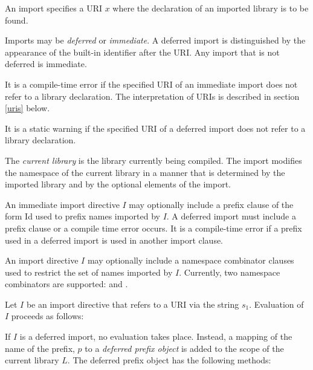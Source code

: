 \documentclass{article}
\newcommand{\code}[1]{{\sf #1}}
\begin{document}
\LMHash{}
An import specifies a URI $x$ where the declaration of an imported library is to be found.

\LMHash{}
Imports may be {\em deferred} or {\em immediate}. A deferred import is distinguished by the appearance of the built-in identifier \DEFERRED{} after the URI. Any import that is not deferred is immediate.

\LMHash{}
It is a compile-time error if  the specified URI of an immediate import does not refer to a library declaration.  The interpretation of URIs is described in section \ref{uris} below.

\LMHash{}
It is a static warning if the specified URI of a deferred import does not refer to a library declaration.



\LMHash{}
The {\em current library} is the library currently being compiled. The import modifies the  namespace of the current library in a manner that is determined by the imported library and by the optional elements of  the import.

\LMHash{}
An immediate import directive $I$ may optionally include a prefix clause of the form \AS{} \code{Id} used to prefix names imported by $I$. A deferred import must include a prefix clause or a compile time error occurs. It is a compile-time error if a prefix used in a deferred import is used in another import clause.

\LMHash{}
An import directive $I$ may optionally include a namespace combinator clauses used to restrict the set of names imported by $I$. Currently, two namespace combinators are supported: \HIDE{} and \SHOW{}.

\LMHash{}
Let $I$ be an import directive that refers to a URI via the string $s_1$. Evaluation of $I$  proceeds as follows:

\LMHash{}
If $I$ is a deferred import, no evaluation takes place. Instead, a mapping of the name of the prefix, $p$ to a {\em deferred prefix object} is added to the scope of the current library $L$.
The deferred prefix object has the following methods:
\end{document}
